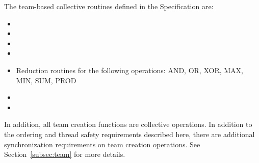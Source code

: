The team-based collective routines defined in the \openshmem Specification are:

\begin{itemize}
\item {}
\item {}
\item {}
\item {}
\item Reduction routines for the following operations: AND, OR, XOR, MAX, MIN, SUM, PROD
\item {}
\item {}
\end{itemize}

In addition, all team creation functions are collective operations. In addition to the ordering
and thread safety requirements described here, there are additional synchronization requirements
on team creation operations. See Section~\ref{subsec:team} for more details.

